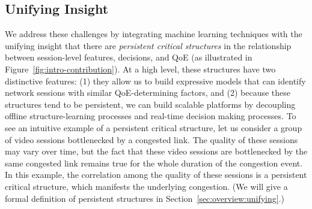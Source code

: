 \subsection{Unifying Insight}
We address these challenges by integrating 
machine learning techniques with
the unifying insight that there are {\em persistent critical structures} in the relationship
between session-level features, decisions, and QoE 
(as illustrated in Figure~\ref{fig:intro-contribution}).
At a high level, these structures have two distinctive features:
(1) they allow us to build expressive models that can identify network 
sessions with similar QoE-determining factors, and 
(2) because these structures tend to be persistent, we can 
build scalable platforms by decoupling offline structure-learning 
processes and real-time decision making processes.
To see an intuitive example of a persistent critical structure, let us consider 
a group of video sessions bottlenecked by a congested link.
The quality of these sessions may vary over time, but the fact
that these video sessions are bottlenecked by the same congested link remains true 
for the whole duration of the congestion event.
In this example, the correlation among the quality of these sessions 
is a persistent critical structure, which manifests the underlying congestion.
(We will give a formal definition of persistent structures in
Section~\ref{sec:overview:unifying}.)





%
%
%
%

